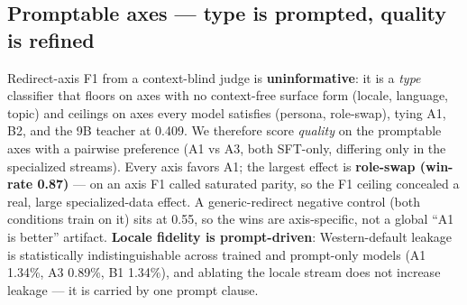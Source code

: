 \subsection{Promptable axes --- type is prompted, quality is
refined}\label{promptable-axes-type-is-prompted-quality-is-refined}

Redirect-axis F1 from a context-blind judge is \textbf{uninformative}:
it is a \emph{type} classifier that floors on axes with no context-free
surface form (locale, language, topic) and ceilings on axes every model
satisfies (persona, role-swap), tying A1, B2, and the 9B teacher at
0.409. We therefore score \emph{quality} on the promptable axes with a
pairwise preference (A1 vs A3, both SFT-only, differing only in the
specialized streams). Every axis favors A1; the largest effect is
\textbf{role-swap (win-rate 0.87)} --- on an axis F1 called saturated
parity, so the F1 ceiling concealed a real, large specialized-data
effect. A generic-redirect negative control (both conditions train on
it) sits at 0.55, so the wins are axis-specific, not a global ``A1 is
better'' artifact. \textbf{Locale fidelity is prompt-driven}:
Western-default leakage is statistically indistinguishable across
trained and prompt-only models (A1 1.34\%, A3 0.89\%, B1 1.34\%), and
ablating the locale stream does not increase leakage --- it is carried
by one prompt clause.
